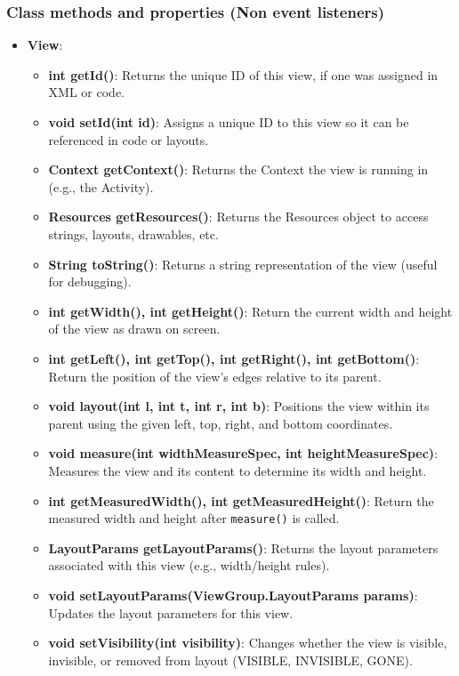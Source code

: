 \documentclass{report}
\begin{document}
    \subsubsection{Class methods and properties (Non event listeners)}
    \begin{itemize}
        \item \textbf{View}:
            \begin{itemize}
                \item \textbf{int getId()}: Returns the unique ID of this view, if one was assigned in XML or code.
                \item \textbf{void setId(int id)}: Assigns a unique ID to this view so it can be referenced in code or layouts.
                \item \textbf{Context getContext()}: Returns the Context the view is running in (e.g., the Activity).
                \item \textbf{Resources getResources()}: Returns the Resources object to access strings, layouts, drawables, etc.
                \item \textbf{String toString()}: Returns a string representation of the view (useful for debugging).
                \item \textbf{int getWidth(), int getHeight()}: Return the current width and height of the view as drawn on screen.
                \item \textbf{int getLeft(), int getTop(), int getRight(), int getBottom()}: Return the position of the view’s edges relative to its parent.
                \item \textbf{void layout(int l, int t, int r, int b)}: Positions the view within its parent using the given left, top, right, and bottom coordinates.
                \item \textbf{void measure(int widthMeasureSpec, int heightMeasureSpec)}: Measures the view and its content to determine its width and height.
                \item \textbf{int getMeasuredWidth(), int getMeasuredHeight()}: Return the measured width and height after \texttt{measure()} is called.
                \item \textbf{LayoutParams getLayoutParams()}: Returns the layout parameters associated with this view (e.g., width/height rules).
                \item \textbf{void setLayoutParams(ViewGroup.LayoutParams params)}: Updates the layout parameters for this view.
                \item \textbf{void setVisibility(int visibility)}: Changes whether the view is visible, invisible, or removed from layout (VISIBLE, INVISIBLE, GONE).

\end{itemize}
\end{itemize}
\end{document}
